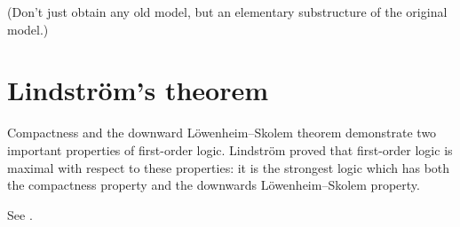\documentclass[10pt, a4paper, oneside]{article}
\theoremstyle{definition}
\theoremstyle{remark}
\theoremstyle{plain}
\theoremstyle{plain}
\begin{document}
(Don't just obtain any old model, but an elementary substructure of the original
model.)


\section{Lindström's theorem}

Compactness and the downward Löwenheim--Skolem theorem demonstrate two
important properties of first-order logic. Lindström proved that first-order
logic is maximal with respect to these properties: it is the strongest logic
which has both the compactness property and the downwards Löwenheim--Skolem
property.

See \citet{vaananen2010}.



\end{document}
